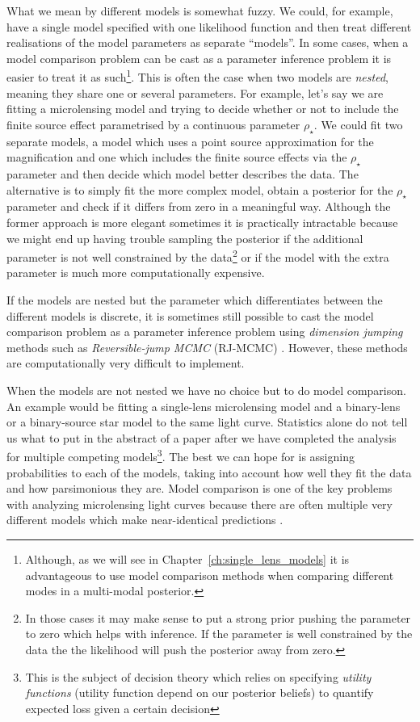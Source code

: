 \documentclass[12pt,dvipsnames]{report}
\begin{document}
What we mean by different models is somewhat fuzzy. We could, for example, have 
a single model specified with one likelihood function 
and then treat different realisations of the model parameters as separate  ``models''. 
In some cases, when a model comparison problem can be cast as a parameter inference problem it 
is easier to treat it as such\footnote{Although, as we
will see in Chapter~\ref{ch:single_lens_models} it is advantageous  to use model 
comparison methods when comparing different modes in a multi-modal posterior.}.
This is often the case when two models are \emph{nested}, meaning they share one or 
several parameters.
For example, let's say we are fitting a microlensing model and trying to decide 
whether  or not to include the finite source effect parametrised by a continuous 
parameter $\rho_\star$.
We could fit two separate models, a model which uses a point source 
approximation for the magnification and one which includes the finite source 
effects via the $\rho_\star$ parameter and then decide which model better 
describes the data. The alternative is to simply fit the more complex model, 
obtain a posterior for the $\rho_\star$ parameter and check if it differs from 
zero in a meaningful way. Although the former approach is more elegant sometimes
it is practically intractable because we might end up having trouble sampling 
the posterior if the additional parameter is not well constrained by the data\footnote{In those
cases it may make sense to put a strong prior pushing the parameter to zero which 
helps with inference. If the parameter is well constrained by the data the 
the likelihood will push the posterior away from zero.} or if the model with the 
extra parameter is much more computationally expensive. 

If the models are nested but the parameter which differentiates between the different 
models is discrete, it is sometimes still possible to cast the model comparison problem 
as a parameter inference problem using \emph{dimension jumping} methods such as 
\emph{Reversible-jump MCMC} (RJ-MCMC)
\citep[See][for an application of a method similar to RJ-MCMC to an 
astronomy problem]{2015MNRAS.448.3206B}.
However, these methods are computationally very difficult to implement.

When the models are not nested we have no choice but to do model comparison. 
An example would be fitting a single-lens microlensing model and a binary-lens 
or a binary-source star model to the same light curve. 
Statistics alone do not tell us what to put in the 
abstract of a paper after we have completed the analysis for multiple competing 
models\footnote{This is the subject of decision theory which relies on 
specifying \emph{utility functions} (utility function depend on our posterior beliefs) 
to quantify expected loss given a certain decision}. The best we can hope for is 
assigning probabilities to each of the models, taking into account how well they 
fit the data and how parsimonious they are. Model 
comparison is one of the key problems with analyzing microlensing light curves 
because there are often multiple very different models which make near-identical 
predictions  
\citep[see][for examples from microlensing]{ 2017AJ....153..129J,2020AJ....160...17H,2021AJ....162...59R}.
\end{document}
